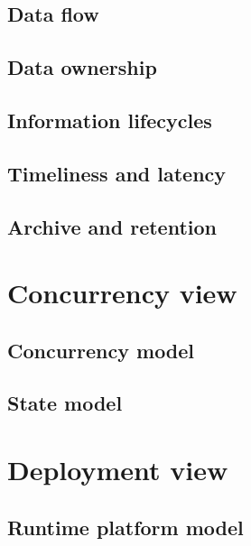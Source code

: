 \subsection{Data flow}
\label{sec:data-flow}


\subsection{Data ownership}
\label{sec:data-ownership}


\subsection{Information lifecycles}
\label{sec:inform-lifecycl}


\subsection{Timeliness and latency}
\label{sec:timeliness-latency}


\subsection{Archive and retention}
\label{sec:archive-retention}


\section{Concurrency view}
\label{sec:concurrency-view}


\subsection{Concurrency model}
\label{sec:concurrency-model}


\subsection{State model}
\label{sec:state-model}


\section{Deployment view}
\label{sec:deployment-view}


\subsection{Runtime platform model}
\label{sec:runt-platf-model}



